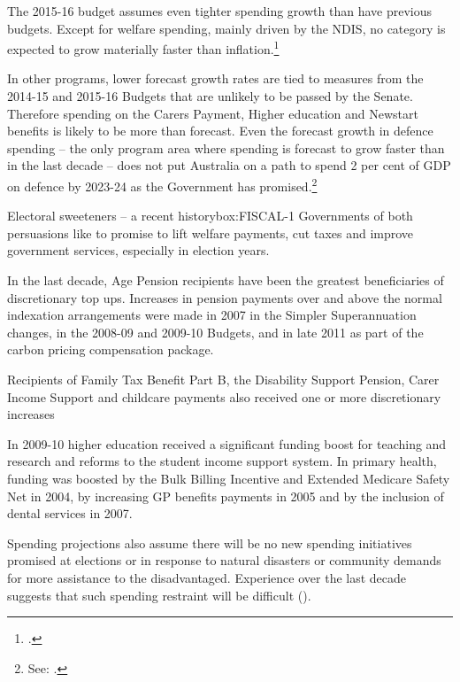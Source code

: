 The 2015-16 budget assumes even tighter spending growth than have previous budgets. Except for welfare spending, mainly driven by the NDIS, no category is expected to grow materially faster than inflation.\footcite[][BP No.~1, pp.~5-11]{Treasury2015BudgetPapers201516}  

In other programs, lower forecast growth rates are tied to measures from the 2014-15 and 2015-16 Budgets that are unlikely to be passed by the Senate. Therefore spending on the Carers Payment, Higher education and Newstart benefits is likely to be more than forecast\DEVIATION{}. Even the forecast growth in defence spending – the only program area where spending is forecast to grow faster than in the last decade – does not put Australia on a path to spend 2 per cent of GDP on defence by 2023-24 as the Government has promised.\footnote{See: \textcite[][1]{Defence2014}.} 

\begin{smallbox}{Electoral sweeteners -- a recent history}{box:FISCAL-1}
Governments of both persuasions like to promise to lift welfare payments, cut taxes and improve government services, especially in election years.  

In the last decade, Age Pension recipients have been the greatest beneficiaries of discretionary top ups. Increases in pension payments over and above the normal indexation arrangements were made in 2007 in the Simpler Superannuation changes, in the 2008-09 and 2009-10 Budgets, and in late 2011 as part of the carbon pricing compensation package.  

Recipients of Family Tax Benefit Part B, the Disability Support Pension, Carer Income Support and childcare payments also received one or more discretionary increases 

In 2009-10 higher education received a significant funding boost for teaching and research and reforms to the student income support system. In primary health, funding was boosted by the Bulk Billing Incentive and Extended Medicare Safety Net in 2004, by increasing GP benefits payments in 2005 and by the inclusion of dental services in 2007. 

\end{smallbox}

Spending projections also assume there will be no new spending initiatives promised at elections or in response to natural disasters or community demands for more assistance to the disadvantaged. Experience over the last decade suggests that such spending restraint will be difficult ().

